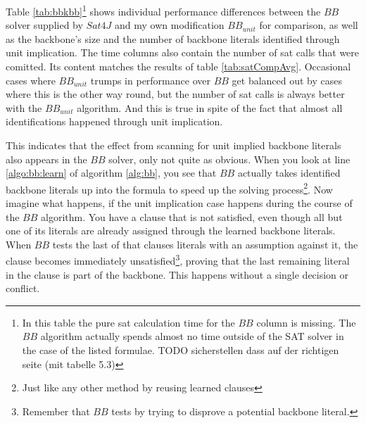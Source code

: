 Table \ref{tab:bbkbb}\footnote{In this table the pure sat calculation time for the $BB$ column is missing. The $BB$ algorithm actually spends almost no time outside of the SAT solver in the case of the listed formulae. TODO sicherstellen dass auf der richtigen seite (mit tabelle 5.3)
	} 
shows individual performance differences between the $BB$ solver supplied by $Sat4J$ and my own modification $BB_{unit}$ for comparison, as well as the backbone's size and the number of backbone literals identified through unit implication. The time columns also contain the number of sat calls that were comitted. Its content matches the results of table \ref{tab:satCompAvg}. Occasional cases where $BB_{unit}$ trumps in performance over $BB$ get balanced out by cases where this is the other way round, but the number of sat calls is always better with the $BB_{unit}$ algorithm. And this is true in spite of the fact that almost all identifications happened through unit implication. 

This indicates that the effect from scanning for unit implied backbone literals also appears in the $BB$ solver, only not quite as obvious. When you look at line \ref{algo:bb:learn} of algorithm \ref{alg:bb}, you see that $BB$ actually takes identified backbone literals up into the formula to speed up the solving process\footnote{Just like any other method by reusing learned clauses}. Now imagine what happens, if the unit implication case happens during the course of the $BB$ algorithm. You have a clause that is not satisfied, even though all but one of its literals are already assigned through the learned backbone literals. When $BB$ tests the last of that clauses literals with an assumption against it, the clause becomes immediately unsatisfied\footnote{Remember that $BB$ tests by trying to disprove a potential backbone literal.}, proving that the last remaining literal in the clause is part of the backbone. This happens without a single decision or conflict. 

